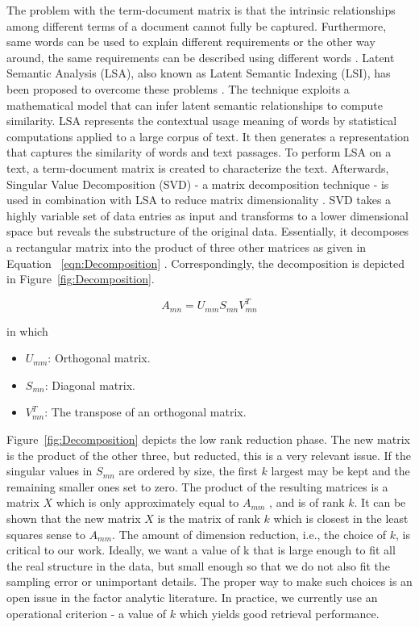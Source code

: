 The problem with the term-document matrix is that the intrinsic relationships among different terms of a document cannot fully be captured. Furthermore, same words can be used to explain different requirements or the other way around, the same requirements can be described using different words \cite{10.1109/APSEC.2004.69}. Latent Semantic Analysis (LSA), also known as Latent Semantic Indexing (LSI), has been proposed to overcome these problems \cite{Landauer1998}. The technique exploits a mathematical model that can infer latent semantic relationships to compute similarity. LSA represents the contextual usage meaning of words by statistical computations applied to a large corpus of text. It then generates a representation that captures the similarity of words and text passages. To perform LSA on a text, a term-document matrix is created to characterize the text. Afterwards, Singular Value Decomposition (SVD) - a matrix decomposition technique - is used in combination with LSA to reduce matrix dimensionality \cite{kb2005}. SVD takes a highly variable set of data entries as input and transforms to a lower dimensional space but reveals the substructure of the original data. Essentially, it decomposes a rectangular matrix into the product of three other matrices as given in Equation ~\ref{eqn:Decomposition} \cite{kb2005}. Correspondingly, the decomposition is depicted in Figure~\ref{fig:Decomposition}.

\begin{equation} \label{eqn:Decomposition}
A_{mn}=U_{mm}S_{mn}V_{mn}^{T}
\end{equation}

in which

\begin{itemize}
	\item $U_{mm}$: Orthogonal matrix.
	\item $S_{mn}$: Diagonal matrix.
	\item $V_{mn}^{T}$: The transpose of an orthogonal matrix.
\end{itemize}


Figure~\ref{fig:Decomposition} depicts the low rank reduction phase. The new matrix is the product of the other three, but reducted, this is a very relevant issue. If the singular values in $S_{mn}$ are ordered by size, the first $k$ largest may be kept and the remaining smaller ones set to zero. The product of the resulting matrices is a matrix $X$ which is only approximately equal to $A_{mm}$ , and is of rank $k$. It can be shown that the new matrix $X$ is the matrix of rank $k$ which is closest in the least squares sense to $A_{mm}$. The amount of dimension reduction, i.e., the choice of $k$, is critical to our work. Ideally, we want a value of k that is large enough to fit all the real structure in the data, but small enough so that we do not also fit the sampling error or unimportant details. The proper way to make such choices is an open issue in the factor analytic literature. In practice, we currently use an operational criterion - a value of $k$ which yields good retrieval performance.%

